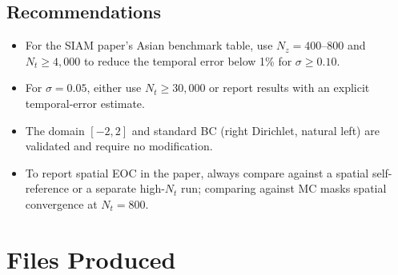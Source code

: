 \documentclass[11pt,a4paper]{article}
\newcommand{\Nz}{N_z}
\newcommand{\Nt}{N_t}
\begin{document}
\subsection{Recommendations}

\begin{itemize}[noitemsep]
  \item For the SIAM paper's Asian benchmark table, use
        $\Nz = 400$--$800$ and $\Nt \ge 4{,}000$ to reduce the
        temporal error below 1\% for $\sigma \ge 0.10$.
  \item For $\sigma = 0.05$, either use $\Nt \ge 30{,}000$ or
        report results with an explicit temporal-error estimate.
  \item The domain $[-2, 2]$ and standard BC (right Dirichlet,
        natural left) are validated and require no modification.
  \item To report spatial EOC in the paper, always compare against
        a spatial self-reference or a separate high-$\Nt$ run;
        comparing against MC masks spatial convergence at $\Nt = 800$.
\end{itemize}

\section{Files Produced}
\end{document}
